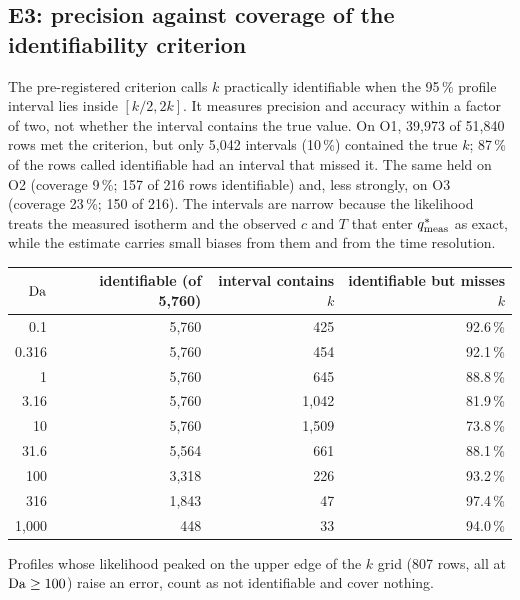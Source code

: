 \subsection*{E3: precision against coverage of the identifiability criterion}
The pre-registered criterion calls $k$ practically identifiable when the 95\,\% profile interval lies
inside $[k/2, 2k]$. It measures precision and accuracy within a factor of two, not whether the
interval contains the true value. On O1, 39,973 of 51,840 rows met the criterion, but only
5,042 intervals (10\,\%) contained the true $k$; 87\,\% of the rows called identifiable had an
interval that missed it. The same held on O2 (coverage 9\,\%; 157 of 216 rows identifiable) and,
less strongly, on O3 (coverage 23\,\%; 150 of 216). The intervals are narrow because the
likelihood treats the measured isotherm and the observed $c$ and $T$ that enter $q^{*}_{\mathrm{meas}}$ as exact,
while the estimate carries small biases from them and from the time resolution.
\begin{center}
\small
\begin{tabular}{@{}rrrr@{}}
\toprule
$\mathrm{Da}$ & identifiable (of 5,760) & interval contains $k$ & identifiable but misses $k$ \\
\midrule
0.1 & 5,760 & 425 & 92.6\,\% \\
0.316 & 5,760 & 454 & 92.1\,\% \\
1 & 5,760 & 645 & 88.8\,\% \\
3.16 & 5,760 & 1,042 & 81.9\,\% \\
10 & 5,760 & 1,509 & 73.8\,\% \\
31.6 & 5,564 & 661 & 88.1\,\% \\
100 & 3,318 & 226 & 93.2\,\% \\
316 & 1,843 & 47 & 97.4\,\% \\
1,000 & 448 & 33 & 94.0\,\% \\
\bottomrule
\end{tabular}
\end{center}
\noindent Profiles whose likelihood peaked on the upper edge of the $k$ grid (807 rows, all at
$\mathrm{Da} \ge 100$) raise an error, count as not identifiable and cover nothing.

